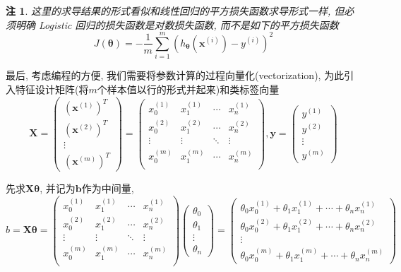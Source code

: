 \documentclass[a4paper,UTF8]{ctexart}
\theoremstyle{plain} \newtheorem{theorem}{定理}[section]
\theoremstyle{plain} \newtheorem{definition}{定义}[section]
\theoremstyle{plain} \newtheorem{lemma}{引理}[section]
\theoremstyle{plain} \newtheorem{proposition}{命题}[section]
\theoremstyle{plain} \newtheorem{example}{例}[section]
\theoremstyle{plain} \newtheorem{remark}{注}[section]
\theoremstyle{plain} \newtheorem{corollary}{推论}[section]
\begin{document}
\begin{remark}
这里的求导结果的形式看似和线性回归的平方损失函数求导形式一样, 但必须明确 Logistic 回归的损失函数是对数损失函数, 而不是如下的平方损失函数
\begin{equation*}
J(\bm{\theta}) = - \frac{1}{m} \sum_{i=1}^{m} (h_{\bm{\theta}}(\bm{x}^{(i)}) - y^{(i)})^2
\end{equation*}


\end{remark}

最后, 考虑编程的方便, 我们需要将参数计算的过程向量化(vectorization), 为此引入特征设计矩阵(将$m$个样本值以行的形式并起来)和类标签向量
$$
\bm{X} = 
\begin{pmatrix}
(\bm{x}^{(1)})^{T} \\
(\bm{x}^{(2)})^{T} \\
\vdots \\
(\bm{x}^{(m)})^{T} 
\end{pmatrix}
=
\begin{pmatrix}
x_{0}^{(1)}  &  x_{1}^{(1)}  &  \cdots  &  x_{n}^{(1)} \\
x_{0}^{(2)}  &  x_{1}^{(2)}  &  \cdots  &  x_{n}^{(2)} \\
\vdots       &  \vdots       &  \ddots  &  \vdots      \\
x_{0}^{(m)}  &  x_{1}^{(m)}  &  \cdots  &  x_{n}^{(m)} \\
\end{pmatrix}
,\bm{y} =
\begin{pmatrix}
y^{(1)} \\
y^{(2)} \\
\vdots  \\
y^{(m)}
\end{pmatrix}
$$

先求$\bm{X} \bm{\theta}$, 并记为$\bm{b}$作为中间量, 
$$
b = \bm{X} \bm{\theta} = 
\begin{pmatrix}
x_{0}^{(1)}  &  x_{1}^{(1)}  &  \cdots  &  x_{n}^{(1)} \\
x_{0}^{(2)}  &  x_{1}^{(2)}  &  \cdots  &  x_{n}^{(2)} \\
\vdots       &  \vdots       &  \ddots  &  \vdots      \\
x_{0}^{(m)}  &  x_{1}^{(m)}  &  \cdots  &  x_{n}^{(m)} \\
\end{pmatrix}
\begin{pmatrix}
\theta_{0} \\
\theta_{1} \\
\vdots     \\
\theta_{n}
\end{pmatrix}
=
\begin{pmatrix}
\theta_{0} x_{0}^{(1)} + \theta_{1} x_{1}^{(1)} + \cdots + \theta_{n} x_{n}^{(1)} \\
\theta_{0} x_{0}^{(2)} + \theta_{1} x_{1}^{(2)} + \cdots + \theta_{n} x_{n}^{(2)} \\
\vdots \\
\theta_{0} x_{0}^{(m)} + \theta_{1} x_{1}^{(m)} + \cdots + \theta_{n} x_{n}^{(m)}
\end{pmatrix}
$$
\end{document}
